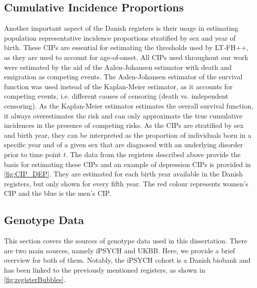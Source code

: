 \subsection{Cumulative Incidence Proportions} \label{sec:CIPs}
Another important aspect of the Danish registers is their usage in estimating population representative incidence proportions stratified by sex and year of birth. These CIPs are essential for estimating the thresholds used by LT-FH++, as they are used to account for age-of-onset. All CIPs used throughout our work were estimated by the aid of the Aalen-Johansen estimator with death and emigration as competing events\cite{hansen2017estimating}. 
The Aalen-Johansen estimator of the survival function was used instead of the Kaplan-Meier estimator, as it accounts for competing events, i.e. different causes of censoring (death vs. independent censoring). As the Kaplan-Meier estimator estimates the overall survival function, it always overestimates the risk and can only approximate the true cumulative incidences in the presence of competing risks\cite{andersen2012competing}. As the CIPs are stratified by sex and birth year, they can be interpreted as the proportion of individuals born in a specific year and of a given sex that are diagnosed with an underlying disorder prior to time point $ t $. The data from the registers described above provide the basis for estimating these CIPs and an example of depression CIPs is provided in \cref{fig:CIP_DEP}. They are estimated for each birth year available in the Danish registers, but only shown for every fifth year. The red colour represents women's CIP and the blue is the men's CIP.


\subsection{Genotype Data}
This section covers the sources of genotype data used in this dissertation. There are two main sources, namely iPSYCH and UKBB. Here, we provide a brief overview for both of them. Notably, the iPSYCH cohort is a Danish biobank and has been linked to the previously mentioned registers, as shown in \cref{fig:registerBubbles}. 


